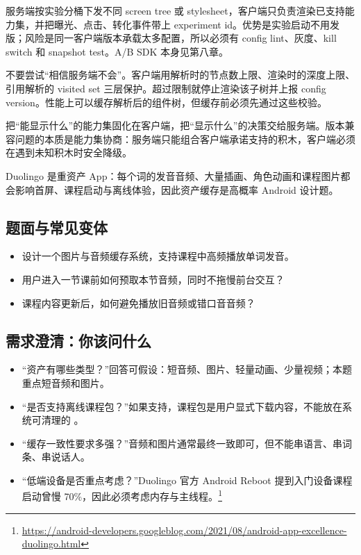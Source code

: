 \begin{followup}
服务端按实验分桶下发不同 screen tree 或 stylesheet，客户端只负责渲染已支持能力集，并把曝光、点击、转化事件带上 experiment id。优势是实验启动不用发版；风险是同一客户端版本承载太多配置，所以必须有 config lint、灰度、kill switch 和 snapshot test。A/B SDK 本身见第八章。
\end{followup}

\begin{followup}[“如果服务端下发会导致布局无限递归的响应怎么办？”]
不要尝试“相信服务端不会”。客户端用解析时的节点数上限、渲染时的深度上限、引用解析的 visited set 三层保护。超过限制就停止渲染该子树并上报 config version。性能上可以缓存解析后的组件树，但缓存前必须先通过这些校验。
\end{followup}

\begin{idea}[能力集与决策的分离]
把“能显示什么”的能力集固化在客户端，把“显示什么”的决策交给服务端。版本兼容问题的本质是能力集协商：服务端只能组合客户端承诺支持的积木，客户端必须在遇到未知积木时安全降级。
\end{idea}


\srcinferred Duolingo 是重资产 App：每个词的发音音频、大量插画、角色动画和课程图片都会影响首屏、课程启动与离线体验，因此资产缓存是高概率 Android 设计题。

\subsection{题面与常见变体}

\begin{itemize}
  \item 设计一个图片与音频缓存系统，支持课程中高频播放单词发音。
  \item 用户进入一节课前如何预取本节音频，同时不拖慢前台交互？
  \item 课程内容更新后，如何避免播放旧音频或错口音音频？
\end{itemize}

\subsection{需求澄清：你该问什么}

\begin{itemize}
  \item “资产有哪些类型？”回答可假设：短音频、图片、轻量动画、少量视频；本题重点短音频和图片。
  \item “是否支持离线课程包？”如果支持，课程包是用户显式下载内容，不能放在系统可清理的 。
  \item “缓存一致性要求多强？”音频和图片通常最终一致即可，但不能串语言、串词条、串说话人。
  \item “低端设备是否重点考虑？”Duolingo 官方 Android Reboot 提到入门设备课程启动曾慢 70\%，因此必须考虑内存与主线程。\srcofficial\footnote{\url{https://android-developers.googleblog.com/2021/08/android-app-excellence-duolingo.html}}
\end{itemize}


